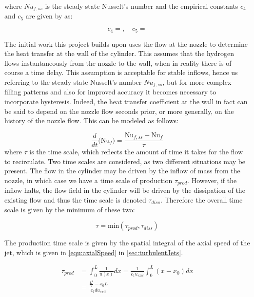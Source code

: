 \noindent where ${Nu}_{f,ss}$ is the steady state Nusselt's number and the empirical constants $c_4$ and $c_5$ are given by  as:

\begin{equation}
\label{equ:nusseltReynoldsConsts}
c_4 =   ,  \quad c_5 = 
\end{equation}

The initial work this project builds upon uses the flow at the nozzle to determine the heat transfer at the wall of the cylinder. This assumes that the hydrogen flows instantaneously from the nozzle to the wall, when in reality there is of course a time delay. This assumption is acceptable for stable inflows, hence us referring to the steady state Nusselt's number ${Nu}_{f,ss}$,  but for more complex filling patterns and also for improved accuracy it becomes necessary to incorporate hysteresis. Indeed, the heat transfer coefficient at the wall in fact can be said to depend on the nozzle flow seconds prior, or more generally, on the history of the nozzle flow. This can be modeled as follows: 

\begin{equation}
\frac{d}{dt}\Big(\text{Nu}_f \Big) = \frac{\text{Nu}_{f,ss}-\text{Nu}_f}{\tau}
\end{equation}
where $\tau$ is the time scale, which reflects the amount of time it takes for the flow to recirculate. Two time scales are considered, as two different situations may be present. The flow in the cylinder may be driven by the inflow of mass from the nozzle, in which case we have a time scale of production $\tau_{prod}$. However, if the inflow halts, the flow field in the cylinder will be driven by the dissipation of the existing flow and thus the time scale is denoted $\tau_{diss}$. Therefore the overall time scale is given by the minimum of these two: 

\begin{equation}
\tau = \text{min}\left(\tau_{prod},\tau_{diss}\right)
\end{equation}

\noindent The production time scale is given by the spatial integral of the axial speed of the jet, which is given in \cref{equ:axialSpeed} in \cref{sec:turbulentJets}.

\begin{equation}
\begin{aligned}
\tau_{prod} &= \int_{0}^{L} \frac{1}{u(x)} dx = \frac{1}{c_1 u_{exit}} \int_0^L \left( x - x_0 \right) dx \\[2ex]
 &= \frac{\frac{L^2}{2} - x_0L}{c_1du_{exit}}
\end{aligned}
\end{equation}

